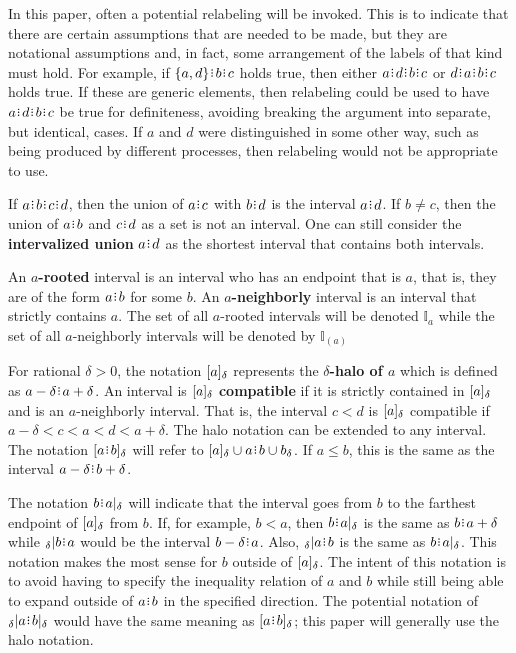 \documentclass[12pt]{article}
\begin{document}
In this paper, often a potential relabeling will be invoked. This is to indicate that there are certain assumptions that are needed to be made, but they are notational assumptions and, in fact, some arrangement of the labels of that kind must hold. For example, if $\{a,d\}\rint b\rint c$ holds true, then either $a\rint d\rint b\rint c$ or $d\rint a\rint b\rint c$ holds true. If these are generic elements, then relabeling could be used to have $a\rint d\rint b\rint c$  be  true for definiteness, avoiding breaking the argument into separate, but identical, cases. If $a$ and $d$ were distinguished in some other way, such as being produced by different processes, then relabeling would not be appropriate to use. 

If $a\rint b\rint c\rint d$, then the union of $a\rint c$ with $b\rint d$ is the interval $a\rint d$. If $b \neq c$, then the union of $a\rint b$ and $c\rint d$ as a set is not an interval. One can still consider the \textbf{intervalized union} $a\rint d$ as the shortest interval that contains both intervals. 

An \textbf{$a$-rooted} interval is an interval who has an endpoint that is $a$, that is, they are of the form $a\rint b$ for some $b$. An  \textbf{$a$-neighborly} interval is an interval that strictly contains $a$. The set of all $a$-rooted intervals will be denoted $\mathbb{I}_a$ while the set of all $a$-neighborly intervals will be denoted by $\mathbb{I}_{(a)}$

For rational $\delta > 0$, the notation $[a]_{\delta}$ represents the \textbf{$\delta$-halo of $a$} which is defined as $a -\delta \rint  a+ \delta$. An interval is $[a]_{\delta}$ \textbf{compatible }if it is strictly contained in $[a]_{\delta}$ and is an $a$-neighborly interval. That is, the interval $c \lt d$ is $[a]_{\delta}$ compatible if $a- \delta < c < a < d < a+ \delta$. The halo notation can be extended to any interval. The notation $\halo{a\rint b}$ will refer to $\halo{a} \cup a\rint b \cup b_\delta$. If $a \leq b$, this is the same as the interval $a-\delta\rint b+\delta$. 


The notation $b\rint a|_\delta$ will indicate that the interval goes from $b$ to the farthest endpoint of $[a]_{\delta}$ from $b$. If, for example, $b < a$, then $b\rint a|_\delta$ is the same as $b\rint a+\delta$ while ${}_\delta|b\rint a$ would be the interval $b-\delta\rint a$. Also, ${}_\delta|a \rint  b$ is the same as $b\rint a|_\delta$. This notation makes the most sense for $b$ outside of $[a]_{\delta}$. The intent of this notation is to avoid having to specify the inequality relation of $a$ and $b$ while still being able to expand outside of $a\rint b$ in the specified direction. The potential notation of ${}_\delta | a\rint b|_\delta$ would have the same meaning as $[a\rint b]_\delta$; this paper will generally use the halo notation. 
\end{document}
